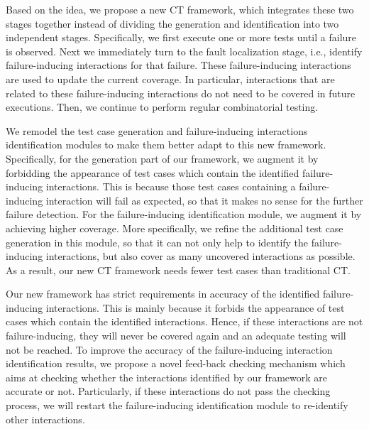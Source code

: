 \documentclass[10pt,journal,compsoc]{IEEEtran}
\begin{document}
Based on the idea, we propose a new CT framework, which integrates these two stages together instead of dividing the generation and identification into two independent stages. Specifically, we first execute one or more tests until a failure is observed. Next we immediately turn to the fault localization stage, i.e., identify failure-inducing interactions for that failure. These failure-inducing interactions are used to update the current coverage. In particular, interactions that are related to these failure-inducing interactions do not need to be covered in future executions. Then, we continue to perform regular combinatorial testing.

We remodel the test case generation and failure-inducing interactions identification modules to make them better adapt to this new framework. Specifically, for the generation part of our framework, we augment it by forbidding the appearance of test cases which contain the identified failure-inducing interactions. This is because those test cases containing a failure-inducing interaction will fail as expected, so that it makes no sense for the further failure detection. For the failure-inducing identification module, we augment it by achieving higher coverage.  More specifically, we refine the additional test case generation in this module, so that it can not only help to identify the failure-inducing interactions, but also cover as many uncovered interactions as possible. As a result, our new CT framework needs fewer test cases than traditional CT.


Our new framework has strict requirements in accuracy of the identified failure-inducing interactions. This is mainly because it forbids the appearance of test cases which contain the identified interactions. Hence, if these interactions are not failure-inducing, they will never be covered again and an adequate testing will not be reached.
To improve the accuracy of the failure-inducing interaction identification results, we propose a novel feed-back checking mechanism which aims at checking whether the interactions identified by our framework are accurate or not. Particularly, if these interactions do not pass the checking process, we will restart the failure-inducing identification module to re-identify other interactions.
\end{document}
